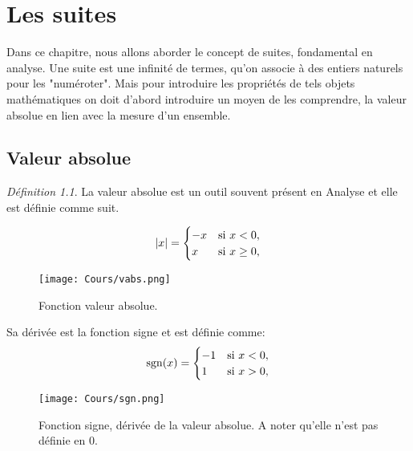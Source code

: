\documentclass[oneside,12pt,french,table]{book}
\theoremstyle{definition}
\theoremstyle{plain}
\theoremstyle{remark}
\newtheorem{defi}[definition]{Définition}
\begin{document}
\chapter{Les suites}
Dans ce chapitre, nous allons aborder le concept de suites, fondamental en analyse. Une suite est une infinité de termes, qu'on associe à des entiers naturels pour les "numéroter". Mais pour introduire les propriétés de tels objets mathématiques on doit d'abord introduire un moyen de les comprendre, la valeur absolue en lien avec la mesure d'un ensemble.
\section{Valeur absolue }
\begin{defi}
    La valeur absolue est un outil souvent présent en Analyse et elle est définie comme suit.
\end{defi} 


\begin{equation}
|x|=
    \begin{cases}
        -x &{\rm si \,\, } x < 0 ,\\
        x &{\rm si \,\, } x \geq 0,
    \end{cases}
\end{equation}
\begin{figure}[H]
    \centering
    \texttt{[image: Cours/vabs.png]}
    \caption{Fonction valeur absolue.}
    \label{fig:Cours/vabs.png}
\end{figure}

Sa dérivée est la fonction signe et est définie comme:
\begin{equation}
{\rm sgn}(x)=
    \begin{cases}
        -1 &{\rm si \,\, } x < 0 ,\\
        1 &{\rm si \,\, } x > 0,
    \end{cases}
\end{equation}
\begin{figure}[H]
    \centering
    \texttt{[image: Cours/sgn.png]}
    \caption{Fonction signe, dérivée de la valeur absolue. A noter qu'elle n'est pas définie en 0.}
    \label{fig:Cours/sgn.png}
\end{figure}
\end{document}
